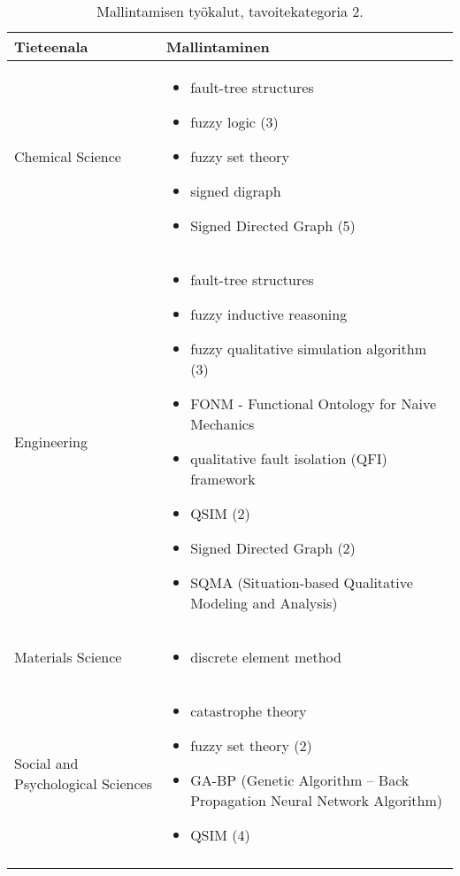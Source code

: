 \documentclass[utf8]{gradu3}
\begin{document}
\begin{longtable}[h]{|p{5cm}|p{8cm}|}
    \hline
    \textbf{Tieteenala}    &    \textbf{Mallintaminen}\\
    \hline
    Chemical Science & \begin{itemize}
        \item fault-tree structures
        \item fuzzy logic (3)
        \item fuzzy set theory
        \item signed digraph
        \item Signed Directed Graph (5)
    \end{itemize} \\
    \hline
    Engineering & \begin{itemize}
        \item fault-tree structures
        \item fuzzy inductive reasoning
        \item fuzzy qualitative simulation algorithm (3)
        \item FONM - Functional Ontology for Naive Mechanics 
        \item qualitative fault isolation (QFI) framework
        \item QSIM (2)
        \item Signed Directed Graph (2)
        \item SQMA (Situation-based Qualitative Modeling and Analysis)
    \end{itemize} \\
    \hline
    Materials Science & \begin{itemize}
        \item discrete element method
    \end{itemize} \\
    \hline
    Social and Psychological Sciences & \begin{itemize}
        \item catastrophe theory
        \item fuzzy set theory (2)
        \item GA-BP (Genetic Algorithm – Back Propagation Neural Network Algorithm)
        \item QSIM (4)
    \end{itemize} \\   
    \hline
    \caption{Mallintamisen työkalut, tavoitekategoria 2.}
    \label{table:mallintaminen 2.}
\end{longtable}
\end{document}
